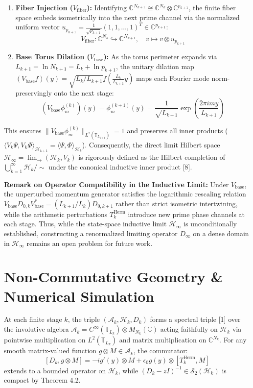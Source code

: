 \documentclass[11pt, a4paper]{article}
\begin{document}
\begin{enumerate}
    \item \textbf{Fiber Injection ($V_{\mathrm{fiber}}$):} Identifying $\mathbb{C}^{N_{k+1}} \cong \mathbb{C}^{N_k} \otimes \mathbb{C}^{p_{k+1}}$, the finite fiber space embeds isometrically into the next prime channel via the normalized uniform vector $u_{p_{k+1}} = \frac{1}{\sqrt{p_{k+1}}}(1, 1, \dots, 1)^T \in \mathbb{C}^{p_{k+1}}$:
    \[ V_{\mathrm{fiber}}: \mathbb{C}^{N_k} \hookrightarrow \mathbb{C}^{N_{k+1}}, \quad v \mapsto v \otimes u_{p_{k+1}} \]
    
    \item \textbf{Base Torus Dilation ($V_{\mathrm{base}}$):} As the torus perimeter expands via $L_{k+1} = \ln N_{k+1} = L_k + \ln p_{k+1}$, the unitary dilation map $(V_{\mathrm{base}}f)(y) = \sqrt{L_k/L_{k+1}} f\left(\frac{L_k}{L_{k+1}}y\right)$ maps each Fourier mode norm-preservingly onto the next stage:
    \[ (V_{\mathrm{base}}\phi_m^{(k)})(y) = \phi_m^{(k+1)}(y) = \frac{1}{\sqrt{L_{k+1}}} \exp\left(\frac{2\pi i m y}{L_{k+1}}\right) \]
\end{enumerate}

This ensures $\|V_{\mathrm{base}}\phi_m^{(k)}\|_{L^2(\mathbb{T}_{L_{k+1}})} = 1$ and preserves all inner products ($\langle V_k\Psi, V_k\Phi\rangle_{\mathcal{H}_{k+1}} = \langle \Psi, \Phi \rangle_{\mathcal{H}_k}$). Consequently, the direct limit Hilbert space $\mathcal{H}_\infty = \lim_{\rightarrow}(\mathcal{H}_k, V_k)$ is rigorously defined as the Hilbert completion of $\bigcup_{k=1}^\infty \mathcal{H}_k / \sim$ under the canonical inductive inner product [8].

\textbf{Remark on Operator Compatibility in the Inductive Limit:} Under $V_{\mathrm{base}}$, the unperturbed momentum generator satisfies the logarithmic rescaling relation $V_{\mathrm{base}} D_{0,k} V_{\mathrm{base}}^* = (L_{k+1}/L_k) D_{0,k+1}$ rather than strict isometric intertwining, while the arithmetic perturbations $T_k^{\mathrm{Herm}}$ introduce new prime phase channels at each stage. Thus, while the state-space inductive limit $\mathcal{H}_\infty$ is unconditionally established, constructing a renormalized limiting operator $D_\infty$ on a dense domain in $\mathcal{H}_\infty$ remains an open problem for future work.

\section{Non-Commutative Geometry \& Numerical Simulation}
At each finite stage $k$, the triple $(\mathcal{A}_k, \mathcal{H}_k, D_k)$ forms a spectral triple [1] over the involutive algebra $\mathcal{A}_k = C^\infty(\mathbb{T}_{L_k}) \otimes M_{N_k}(\mathbb{C})$ acting faithfully on $\mathcal{H}_k$ via pointwise multiplication on $L^2(\mathbb{T}_{L_k})$ and matrix multiplication on $\mathbb{C}^{N_k}$. For any smooth matrix-valued function $g \otimes M \in \mathcal{A}_k$, the commutator:
\[ [D_k, g \otimes M] = -ig'(y) \otimes M + \epsilon_0 g(y) \otimes [T_k^{\mathrm{Herm}}, M] \]
extends to a bounded operator on $\mathcal{H}_k$, while $(D_k - zI)^{-1} \in \mathcal{S}_2(\mathcal{H}_k)$ is compact by Theorem 4.2.
\end{document}
